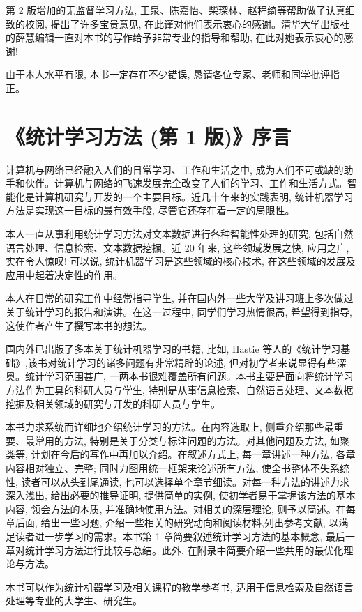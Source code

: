 \documentclass[10pt]{article}
\begin{document}
\begin{CJK*}{UTF8}{bsmi}
第 2 版增加的无监督学习方法, 王泉、陈嘉怡、柴琛林、赵程绮等帮助做了认真细致的校阅, 提出了许多宝贵意见, 在此谨对他们表示衷心的感谢。清华大学出版社的薛慧编辑一直对本书的写作给予非常专业的指导和帮助, 在此对她表示衷心的感谢!

由于本人水平有限, 本书一定存在不少错误, 恳请各位专家、老师和同学批评指正。

\section*{《统计学习方法 (第 1 版)》序言}
计算机与网络已经融入人们的日常学习、工作和生活之中, 成为人们不可或缺的助手和伙伴。计算机与网络的飞速发展完全改变了人们的学习、工作和生活方式。智能化是计算机研究与开发的一个主要目标。近几十年来的实践表明, 统计机器学习方法是实现这一目标的最有效手段, 尽管它还存在着一定的局限性。

本人一直从事利用统计学习方法对文本数据进行各种智能性处理的研究, 包括自然语言处理、信息检索、文本数据挖掘。近 20 年来, 这些领域发展之快, 应用之广, 实在令人惊叹! 可以说, 统计机器学习是这些领域的核心技术, 在这些领域的发展及应用中起着决定性的作用。

本人在日常的研究工作中经常指导学生, 并在国内外一些大学及讲习班上多次做过关于统计学习的报告和演讲。在这一过程中, 同学们学习热情很高, 希望得到指导, 这使作者产生了撰写本书的想法。

国内外已出版了多本关于统计机器学习的书籍, 比如, Hastie 等人的《统计学习基础》,该书对统计学习的诸多问题有非常精辟的论述, 但对初学者来说显得有些深奥。统计学习范围甚广, 一两本书很难覆盖所有问题。本书主要是面向将统计学习方法作为工具的科研人员与学生, 特别是从事信息检索、自然语言处理、文本数据挖掘及相关领域的研究与开发的科研人员与学生。

本书力求系统而详细地介绍统计学习的方法。在内容选取上, 侧重介绍那些最重要、最常用的方法, 特别是关于分类与标注问题的方法。对其他问题及方法, 如聚类等, 计划在今后的写作中再加以介绍。在叙述方式上, 每一章讲述一种方法, 各章内容相对独立、完整; 同时力图用统一框架来论述所有方法, 使全书整体不失系统性, 读者可以从头到尾通读, 也可以选择单个章节细读。对每一种方法的讲述力求深入浅出, 给出必要的推导证明, 提供简单的实例, 使初学者易于掌握该方法的基本内容, 领会方法的本质, 并准确地使用方法。对相关的深层理论, 则予以简述。在每章后面, 给出一些习题, 介绍一些相关的研究动向和阅读材料,列出参考文献, 以满足读者进一步学习的需求。本书第 1 章简要叙述统计学习方法的基本概念, 最后一章对统计学习方法进行比较与总结。此外, 在附录中简要介绍一些共用的最优化理论与方法。

本书可以作为统计机器学习及相关课程的教学参考书, 适用于信息检索及自然语言处理等专业的大学生、研究生。


\end{CJK*}
\end{document}

